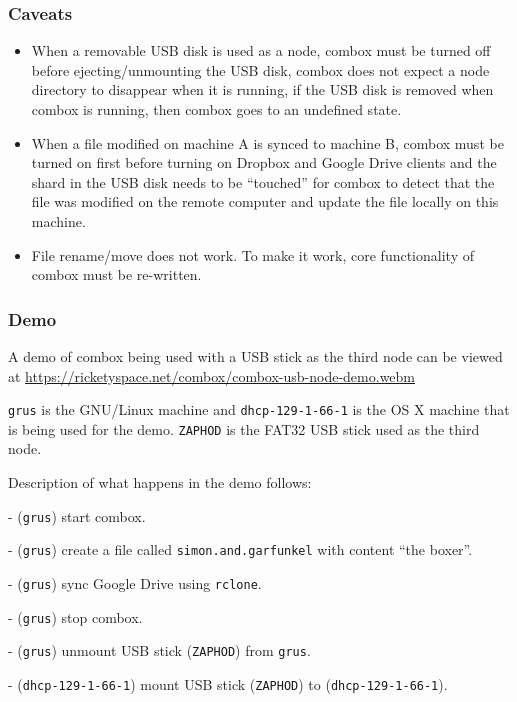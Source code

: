 \subsubsection{Caveats}

\begin{itemize}
\item When a removable USB disk is used as a node, combox must be
  turned off before ejecting/unmounting the USB disk, combox does not
  expect a node directory to disappear when it is running, if the USB
  disk is removed when combox is running, then combox goes to an
  undefined state.

\item When a file modified on machine A is synced to machine B, combox
  must be turned on first before turning on Dropbox and Google Drive
  clients and the shard in the USB disk needs to be ``touched'' for
  combox to detect that the file was modified on the remote computer
  and update the file locally on this machine.

\item File rename/move does not work. To make it work, core
  functionality of combox must be re-written.
\end{itemize}

\subsubsection{Demo}

A demo of combox being used with a USB stick as the third node can be
viewed at
\url{https://ricketyspace.net/combox/combox-usb-node-demo.webm}

\verb+grus+ is the GNU/Linux machine and \verb+dhcp-129-1-66-1+ is the
OS X machine that is being used for the demo. \verb+ZAPHOD+ is the
FAT32 USB stick used as the third node.

Description of what happens in the demo follows:

- (\verb+grus+) start combox.

- (\verb+grus+) create a file called \verb+simon.and.garfunkel+ with
content ``the boxer''.

- (\verb+grus+) sync Google Drive using \verb+rclone+.

- (\verb+grus+) stop combox.

- (\verb+grus+) unmount USB stick (\verb+ZAPHOD+) from \verb+grus+.

- (\verb+dhcp-129-1-66-1+) mount USB stick (\verb+ZAPHOD+) to
(\verb+dhcp-129-1-66-1+).

